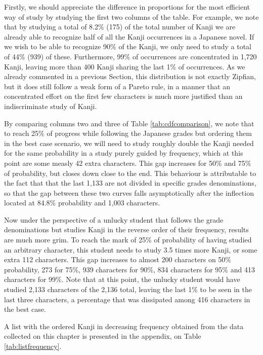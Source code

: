 Firstly, we should appreciate the difference in proportions for the most efficient way of study by studying the first two columns of the table. For example, we note that by studying a total of 8.2\% (175) of the total number of Kanji we are already able to recognize half of all the Kanji occurrences in a Japanese novel. If we wish to be able to recognize 90\% of the Kanji, we only need to study a total of 44\% (939) of these. Furthermore, 99\% of occurrences are concentrated in 1,720 Kanji, leaving more than 400 Kanji sharing the last 1\% of occurrences. As we already commented in a previous Section, this distribution is not exactly Zipfian, but it does still follow a weak form of a Pareto rule, in a manner that an concentrated effort on the first few characters is much more justified than an indiscriminate study of Kanji.

By comparing columns two and three of Table \ref{tab:cdfcomparison}, we note that to reach 25\% of progress while following the Japanese grades but ordering them in the best case scenario, we will need to study roughly double the Kanji needed for the same probability in a study purely guided by frequency, which at this point are some measly 42 extra characters. This gap increases for 50\% and 75\% of probability, but closes down close to the end. This behaviour is attributable to the fact that that the last 1,133 are not divided in specific grades denominations, so that the gap between these two curves falls asymptotically after the inflection located at 84.8\% probability and 1,003 characters.

Now under the perspective of a unlucky student that follows the grade denominations but studies Kanji in the reverse order of their frequency, results are much more grim. To reach the mark of 25\% of probability of having studied an arbitrary character, this student needs to study 3.5 times more Kanji, or some extra 112 characters. This gap increases to almost 200 characters on 50\% probability, 273 for 75\%, 939 characters for 90\%, 834 characters for 95\% and 413 characters for 99\%. Note that at this point, the unlucky student would have studied 2,133 characters of the 2,136 total, leaving the last 1\% to be seen in the last three characters, a percentage that was dissipated among 416 characters in the best case.

A list with the ordered Kanji in decreasing frequency obtained from the data collected on this chapter is presented in the appendix, on Table \ref{tab:listfrequency}.